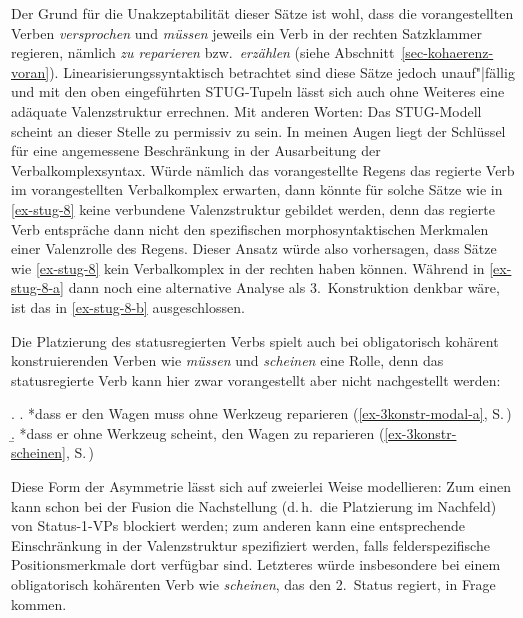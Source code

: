Der Grund für die Unakzeptabilität dieser Sätze ist wohl, dass die vorangestellten Verben {\it versprochen} und {\it müssen} jeweils ein Verb in der rechten Satzklammer regieren, nämlich {\it zu reparieren} bzw.\ {\it erzählen} (siehe Abschnitt~\ref{sec-kohaerenz-voran}). Linearisierungssyntaktisch betrachtet sind diese Sätze jedoch unauf"|fällig und mit den oben eingeführten STUG-Tupeln lässt sich auch ohne Weiteres eine adäquate Valenzstruktur errechnen. Mit anderen Worten: Das STUG-Modell scheint an dieser Stelle zu permissiv zu sein. In meinen Augen liegt der Schlüssel für eine angemessene Beschränkung in der Ausarbeitung der Verbalkomplexsyntax. Würde nämlich das vorangestellte Regens das regierte Verb im vorangestellten Verbalkomplex erwarten, dann könnte für solche Sätze wie in \ref{ex-stug-8} keine verbundene Valenzstruktur gebildet werden, denn das regierte Verb entspräche dann nicht den spezifischen morphosyntaktischen Merkmalen einer Valenzrolle des Regens. Dieser Ansatz würde also vorhersagen, dass Sätze wie \ref{ex-stug-8} kein Verbalkomplex in der rechten  haben können. Während in \ref{ex-stug-8-a} dann noch eine alternative Analyse als 3.~Konstruktion denkbar wäre, ist das in \ref{ex-stug-8-b} ausgeschlossen. 

Die Platzierung des statusregierten Verbs spielt auch bei obligatorisch kohärent konstruierenden Verben wie {\it müssen} und {\it scheinen} eine Rolle, denn das statusregierte Verb kann hier zwar vorangestellt aber nicht nachgestellt werden:

\ex.
\a. *dass er den Wagen muss ohne Werkzeug reparieren \hfill (\ref{ex-3konstr-modal-a}, S.\,\pageref{ex-3konstr-modal-a})
\b. *dass er ohne Werkzeug scheint, den Wagen zu reparieren \hfill (\ref{ex-3konstr-scheinen}, S.\,\pageref{ex-3konstr-scheinen})

Diese Form der Asymmetrie lässt sich auf zweierlei Weise modellieren: Zum einen kann schon bei der Fusion die Nachstellung (d.\,h.\ die Platzierung im Nachfeld) von Status-1-VPs blockiert werden; zum anderen kann eine entsprechende Einschränkung in der Valenzstruktur spezifiziert werden, falls felderspezifische \clearpage Positionsmerkmale dort verfügbar sind. Letzteres würde insbesondere bei einem obligatorisch kohärenten Verb wie {\it scheinen}, das den 2.~Status regiert, in Frage kommen.


